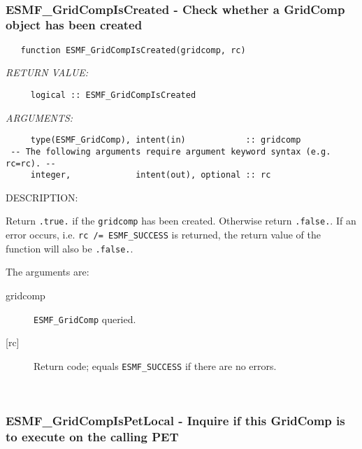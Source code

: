  
\mbox{}\hrulefill\ 
 
\subsubsection [ESMF\_GridCompIsCreated] {ESMF\_GridCompIsCreated - Check whether a GridComp object has been created}


 
\begin{verbatim}   function ESMF_GridCompIsCreated(gridcomp, rc)\end{verbatim}{\em RETURN VALUE:}
\begin{verbatim}     logical :: ESMF_GridCompIsCreated\end{verbatim}{\em ARGUMENTS:}
\begin{verbatim}     type(ESMF_GridComp), intent(in)            :: gridcomp
 -- The following arguments require argument keyword syntax (e.g. rc=rc). --
     integer,             intent(out), optional :: rc
 \end{verbatim}
{\sf DESCRIPTION:\\ }


     Return {\tt .true.} if the {\tt gridcomp} has been created. Otherwise return
     {\tt .false.}. If an error occurs, i.e. {\tt rc /= ESMF\_SUCCESS} is
     returned, the return value of the function will also be {\tt .false.}.
  
   The arguments are:
     \begin{description}
     \item[gridcomp]
       {\tt ESMF\_GridComp} queried.
     \item[{[rc]}]
       Return code; equals {\tt ESMF\_SUCCESS} if there are no errors.
     \end{description}
   
 
\mbox{}\hrulefill\ 
 
\subsubsection [ESMF\_GridCompIsPetLocal] {ESMF\_GridCompIsPetLocal - Inquire if this GridComp is to execute on the calling PET}


